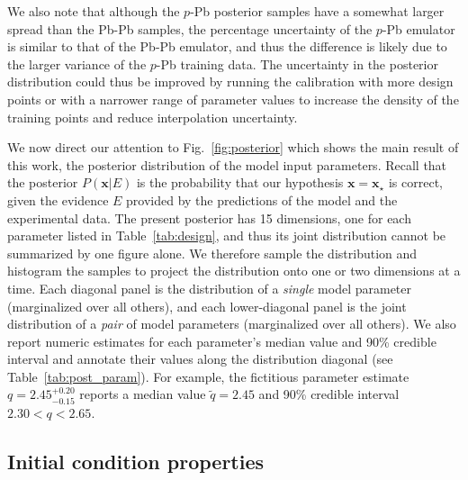 \documentclass[aps,prc,reprint,amsmath,nofootinbib]{revtex4-1}
\newcommand{\xv}{\mathbf x}
\newenvironment{fullpage}{\onecolumngrid}{\clearpage\twocolumngrid}
\begin{document}
\begin{fullpage}
  \centering
  \vspace*{10pt}
\end{fullpage}

\noindent
We also note that although the $p$-Pb posterior samples have a somewhat larger spread than the Pb-Pb samples, the percentage uncertainty of the $p$-Pb emulator is similar to that of the Pb-Pb emulator, and thus the difference is likely due to the larger variance of the $p$-Pb training data.
The uncertainty in the posterior distribution could thus be improved by running the calibration with more design points or with a narrower range of parameter values to increase the density of the training points and reduce interpolation uncertainty.

We now direct our attention to Fig.~\ref{fig:posterior} which shows the main result of this work, the posterior distribution of the model input parameters.
Recall that the posterior $P(\xv | E)$ is the probability that our hypothesis $\xv = \xv_\star$ is correct, given the evidence $E$ provided by the predictions of the model and the experimental data.
The present posterior has 15 dimensions, one for each parameter listed in Table~\ref{tab:design}, and thus its joint distribution cannot be summarized by one figure alone.
We therefore sample the distribution and histogram the samples to project the distribution onto one or two dimensions at a time.
Each diagonal panel is the distribution of a \emph{single} model parameter (marginalized over all others), and each lower-diagonal panel is the joint distribution of a \emph{pair} of model parameters (marginalized over all others).
We also report numeric estimates for each parameter's median value and 90\% credible interval and annotate their values along the distribution diagonal (see Table~\ref{tab:post_param}).
For example, the fictitious parameter estimate $q=2.45_{-0.15}^{+0.20}$ reports a median value $\tilde{q}=2.45$ and 90\% credible interval $2.30 < q < 2.65$.

\subsection{Initial condition properties}
\end{document}

